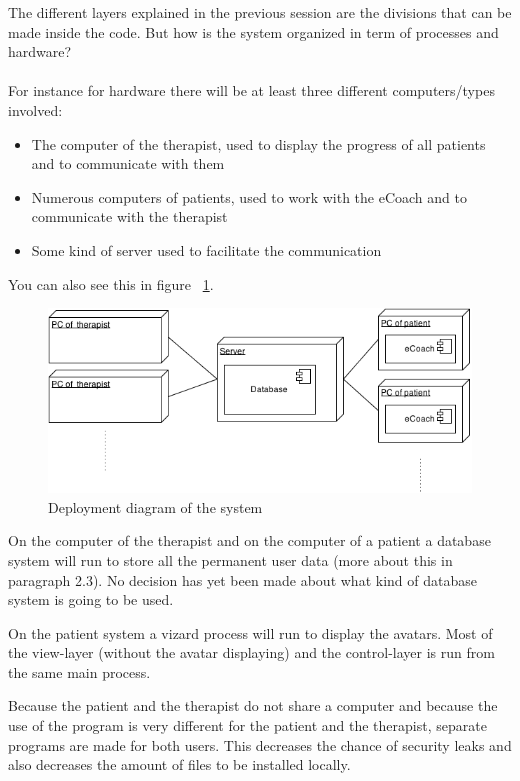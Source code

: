 
The different layers explained in the previous session are the divisions that can be made inside the code. But how is the system organized in term of processes and hardware? 
\paragraph{}
For instance for hardware there will be at least three different computers/types involved: 
\begin{itemize}
\item The computer of the therapist, used to display the progress of all patients and to communicate with them
\item Numerous computers of patients, used to work with the eCoach and to communicate with the therapist
\item Some kind of server used to facilitate the communication
\end{itemize}
You can also see this in figure ~\ref{fig:deploymentdiagram}.
\begin{figure}[H]
  \centering
  \includegraphics[width=\textwidth]{deployment-diagram.png}
  \caption{Deployment diagram of the system} 
  \label{fig:deploymentdiagram}
\end{figure}
On the computer of the therapist and on the computer of a patient a database system will run to store all the permanent user data (more about this in paragraph 2.3).  No decision has yet been made about what kind of database system is going to be used.

On the patient system a vizard process will run to display the avatars. Most of the view-layer (without the avatar displaying) and the control-layer is run from the same main process. 

Because the patient and the therapist do not share a computer and because the use of the program is very different for the patient and the therapist, separate programs are made for both users. This decreases the chance of security leaks and also decreases the amount of files to be installed locally.

